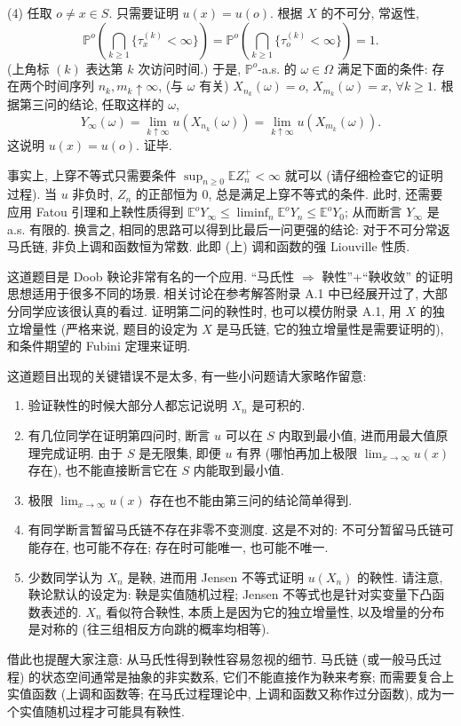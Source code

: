 \begin{enumerate}
\begin{proofc}[证明]
        (4) 任取 $o\neq x\in S$. 只需要证明 $u(x)=u(o)$. 根据 $X$ 的不可分, 常返性,
        \[
            \mathbb P^o\left(\bigcap_{k\geq 1}\{\tau_x^{(k)}<\infty\}\right)
            =
            \mathbb P^o\left(\bigcap_{k\geq 1}\{\tau_o^{(k)}<\infty\}\right)=1.
        \]
        (上角标 $(k)$ 表达第 $k$ 次访问时间.) 于是, $\mathbb P^o$-a.s. 的 $\omega\in\Omega$
        满足下面的条件: 存在两个时间序列 $n_k,m_k\uparrow\infty$, (与 $\omega$ 有关)
        $X_{n_k}(\omega)=o$, $X_{m_k}(\omega)=x$, $\forall k\geq 1$.
        根据第三问的结论, 任取这样的 $\omega$,
        \[
            Y_\infty(\omega)=\lim_{k\uparrow\infty}u(X_{n_k}(\omega))
            =\lim_{k\uparrow\infty}u(X_{m_k}(\omega)).
        \]
        这说明 $u(x)=u(o)$. 证毕.

        事实上, 上穿不等式只需要条件 $\sup_{n\geq 0}\mathbb E Z_n^+<\infty$ 就可以
        (请仔细检查它的证明过程). 当 $u$ 非负时, $Z_n$ 的正部恒为 $0$, 总是满足上穿不等式的条件.
        此时, 还需要应用 Fatou 引理和上鞅性质得到
        $\mathbb E^oY_\infty\leq \liminf_n\mathbb E^oY_n\leq \mathbb E^oY_0$;
        从而断言 $Y_\infty$ 是 a.s. 有限的. 换言之, 相同的思路可以得到比最后一问更强的结论:
        对于不可分常返马氏链, 非负上调和函数恒为常数. 此即 (上) 调和函数的强 Liouville 性质.

           这道题目是 Doob 鞅论非常有名的一个应用. “马氏性 $\Rightarrow$ 鞅性”+“鞅收敛” 的证明思想适用于很多不同的场景. 相关讨论在参考解答附录 A.1 中已经展开过了, 大部分同学应该很认真的看过. 证明第二问的鞅性时, 也可以模仿附录 A.1, 用 $X$ 的独立增量性 (严格来说, 题目的设定为 $X$ 是马氏链, 它的独立增量性是需要证明的), 和条件期望的 Fubini 定理来证明. 
    
    这道题目出现的关键错误不是太多, 有一些小问题请大家略作留意: \begin{enumerate}[label=(\arabic*)] \item 验证鞅性的时候大部分人都忘记说明 $X_n$ 是可积的. \item 有几位同学在证明第四问时, 断言 $u$ 可以在 $S$ 内取到最小值, 进而用最大值原理完成证明. 由于 $S$ 是无限集, 即便 $u$ 有界 (哪怕再加上极限 $\lim_{x\to\infty}u(x)$ 存在), 也不能直接断言它在 $S$ 内能取到最小值. \item 极限 $\lim_{x\to\infty}u(x)$ 存在也不能由第三问的结论简单得到. \item 有同学断言暂留马氏链不存在非零不变测度. 这是不对的: 不可分暂留马氏链可能存在, 也可能不存在; 存在时可能唯一, 也可能不唯一. \item 少数同学认为 $X_n$ 是鞅, 进而用 Jensen 不等式证明 $u(X_n)$ 的鞅性. 请注意, 鞅论默认的设定为: 鞅是实值随机过程; Jensen 不等式也是针对实变量下凸函数表述的. $X_n$ 看似符合鞅性, 本质上是因为它的独立增量性, 以及增量的分布是对称的 (往三组相反方向跳的概率均相等). \end{enumerate} 借此也提醒大家注意: 从马氏性得到鞅性容易忽视的细节. 马氏链 (或一般马氏过程) 的状态空间通常是抽象的非实数系, 它们不能直接作为鞅来考察; 而需要复合上实值函数 (上调和函数等; 在马氏过程理论中, 上调和函数又称作过分函数), 成为一个实值随机过程才可能具有鞅性.
    \end{proofc}
\end{enumerate}
\printfootnotes

